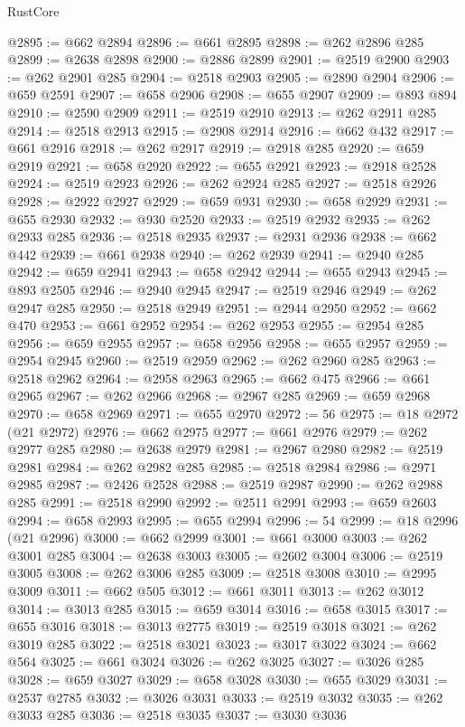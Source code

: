 \begin{lexlean}{RustCore}
\begin{coremodule}
@2895 := @662 @2894
@2896 := @661 @2895
@2898 := @262 @2896 @285
@2899 := @2638 @2898
@2900 := @2886 @2899
@2901 := @2519 @2900
@2903 := @262 @2901 @285
@2904 := @2518 @2903
@2905 := @2890 @2904
@2906 := @659 @2591
@2907 := @658 @2906
@2908 := @655 @2907
@2909 := @893 @894
@2910 := @2590 @2909
@2911 := @2519 @2910
@2913 := @262 @2911 @285
@2914 := @2518 @2913
@2915 := @2908 @2914
@2916 := @662 @432
@2917 := @661 @2916
@2918 := @262 @2917
@2919 := @2918 @285
@2920 := @659 @2919
@2921 := @658 @2920
@2922 := @655 @2921
@2923 := @2918 @2528
@2924 := @2519 @2923
@2926 := @262 @2924 @285
@2927 := @2518 @2926
@2928 := @2922 @2927
@2929 := @659 @931
@2930 := @658 @2929
@2931 := @655 @2930
@2932 := @930 @2520
@2933 := @2519 @2932
@2935 := @262 @2933 @285
@2936 := @2518 @2935
@2937 := @2931 @2936
@2938 := @662 @442
@2939 := @661 @2938
@2940 := @262 @2939
@2941 := @2940 @285
@2942 := @659 @2941
@2943 := @658 @2942
@2944 := @655 @2943
@2945 := @893 @2505
@2946 := @2940 @2945
@2947 := @2519 @2946
@2949 := @262 @2947 @285
@2950 := @2518 @2949
@2951 := @2944 @2950
@2952 := @662 @470
@2953 := @661 @2952
@2954 := @262 @2953
@2955 := @2954 @285
@2956 := @659 @2955
@2957 := @658 @2956
@2958 := @655 @2957
@2959 := @2954 @2945
@2960 := @2519 @2959
@2962 := @262 @2960 @285
@2963 := @2518 @2962
@2964 := @2958 @2963
@2965 := @662 @475
@2966 := @661 @2965
@2967 := @262 @2966
@2968 := @2967 @285
@2969 := @659 @2968
@2970 := @658 @2969
@2971 := @655 @2970
@2972 := 56
@2975 := @18 @2972 (@21 @2972)
@2976 := @662 @2975
@2977 := @661 @2976
@2979 := @262 @2977 @285
@2980 := @2638 @2979
@2981 := @2967 @2980
@2982 := @2519 @2981
@2984 := @262 @2982 @285
@2985 := @2518 @2984
@2986 := @2971 @2985
@2987 := @2426 @2528
@2988 := @2519 @2987
@2990 := @262 @2988 @285
@2991 := @2518 @2990
@2992 := @2511 @2991
@2993 := @659 @2603
@2994 := @658 @2993
@2995 := @655 @2994
@2996 := 54
@2999 := @18 @2996 (@21 @2996)
@3000 := @662 @2999
@3001 := @661 @3000
@3003 := @262 @3001 @285
@3004 := @2638 @3003
@3005 := @2602 @3004
@3006 := @2519 @3005
@3008 := @262 @3006 @285
@3009 := @2518 @3008
@3010 := @2995 @3009
@3011 := @662 @505
@3012 := @661 @3011
@3013 := @262 @3012
@3014 := @3013 @285
@3015 := @659 @3014
@3016 := @658 @3015
@3017 := @655 @3016
@3018 := @3013 @2775
@3019 := @2519 @3018
@3021 := @262 @3019 @285
@3022 := @2518 @3021
@3023 := @3017 @3022
@3024 := @662 @564
@3025 := @661 @3024
@3026 := @262 @3025
@3027 := @3026 @285
@3028 := @659 @3027
@3029 := @658 @3028
@3030 := @655 @3029
@3031 := @2537 @2785
@3032 := @3026 @3031
@3033 := @2519 @3032
@3035 := @262 @3033 @285
@3036 := @2518 @3035
@3037 := @3030 @3036

\end{coremodule}
\end{lexlean}
